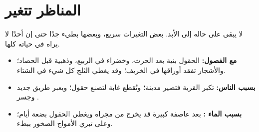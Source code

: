\section{المناظر تتغير}

لا يبقى  على حاله إلى الأبد. بعض التغيرات سريع، وبعضها بطيء جدًا
حتى إن أحدًا لا يراه في حياته كلها.
\begin{itemize}
  \item \textbf{مع الفصول:} الحقول بنية بعد الحرث، وخضراء في الربيع،
        وذهبية قبل الحصاد؛ والأشجار تفقد أوراقها في الخريف؛ وقد يغطي
        الثلج كل شيء في الشتاء.
  \item \textbf{بسبب الناس:} تكبر القرية فتصير مدينة؛ وتُقطع غابة لتصنع
        حقول؛ ويعبر طريق جديد وجسر .
  \item \textbf{بسبب الماء :} بعد عاصفة كبيرة قد يخرج  من
        مجراه ويغطي الحقول بضعة أيام؛ وعلى  تبري الأمواج الصخور
        ببطء.
\end{itemize}

